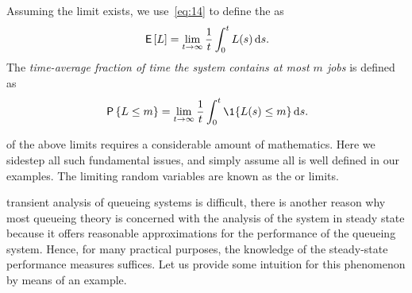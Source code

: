 Assuming the limit exists, we use~\cref{eq:14} to define the  as
\begin{equation} \label{eq:46}
 \,\mathsf{E}\left[L\right] = \lim_{t\to\infty} \frac 1 t\int_0^t L(s) \,\textrm{d}s.
\end{equation}
 The \emph{time-average fraction of time the system contains at most $m$ jobs} is defined as
\begin{equation*}
 \P{\L\leq m} =\lim_{t\to\infty} \frac 1 t\int_0^t \1{\L(s)\leq m} \d s.
\end{equation*}

 of the above limits requires a considerable amount of mathematics.
Here we sidestep all such fundamental issues, and simply assume all is well defined in our examples.
The limiting random variables are known as the  or  limits.

 transient analysis of queueing systems is difficult, there is another reason why most queueing theory is concerned with the analysis of the system in steady state because it offers  reasonable approximations for the performance of the  queueing system. Hence, for many practical purposes, the knowledge of the steady-state performance measures suffices.
Let us provide some intuition for this phenomenon by means of an example.


